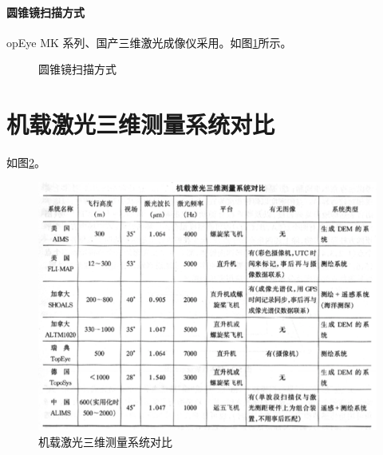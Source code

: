 \paragraph{圆锥镜扫描方式}opEye MK 系列、国产三维激光成像仪采用。如图\ref{fig:圆锥镜扫描方式}所示。
\newsavebox{\tempbox}
\begin{figure}[htbp]
	\centering
	\subfloat[圆锥镜扫描原理]{\usebox{\tempbox}}
	\caption{圆锥镜扫描方式}
	\label{fig:圆锥镜扫描方式}
\end{figure}
\section{机载激光三维测量系统对比}
如图\ref{fig:机载激光三维测量系统对比}。
\begin{figure}[!htbp]
	\centering
	\includegraphics[width=1\linewidth]{figure/Chapter1/机载激光三维测量系统对比}
	\caption{机载激光三维测量系统对比}
	\label{fig:机载激光三维测量系统对比}
\end{figure}
